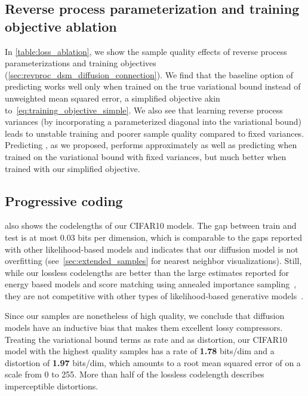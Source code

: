 \documentclass{article}
\begin{document}
\subsection{Reverse process parameterization and training objective ablation}
\label{sec:loss_ablation}

In \cref{table:loss_ablation}, we show the sample quality effects of reverse process parameterizations and training objectives (\cref{sec:revproc_dsm_diffusion_connection}). We find that the baseline option of predicting  works well only when trained on the true variational bound instead of unweighted mean squared error, a simplified objective akin to~\cref{eq:training_objective_simple}. We also see that learning reverse process variances (by incorporating a parameterized diagonal  into the variational bound) leads to unstable training and poorer sample quality compared to fixed variances. Predicting , as we proposed, performs approximately as well as predicting  when trained on the variational bound with fixed variances, but much better when trained with our simplified objective.




\subsection{Progressive coding}
\label{sec:coding}

 also shows the codelengths of our CIFAR10 models. The gap between train and test is at most 0.03 bits per dimension, which is comparable to the gaps reported with other likelihood-based models and indicates that our diffusion model is not overfitting (see~\cref{sec:extended_samples} for nearest neighbor visualizations).
Still, while our lossless codelengths are better than the large estimates reported for energy based models and score matching using annealed importance sampling~\citep{du2019implicit}, they are not competitive with other types of likelihood-based generative models~\citep{child2019generating}.

Since our samples are nonetheless of high quality, we conclude that diffusion models have an inductive bias that makes them excellent lossy compressors. Treating the variational bound terms  as rate and  as distortion, our CIFAR10 model with the highest quality samples has a rate of \textbf{1.78} bits/dim and a distortion of \textbf{1.97} bits/dim, which amounts to a root mean squared error of  on a scale from 0 to 255. More than half of the lossless codelength describes imperceptible distortions.
\end{document}
